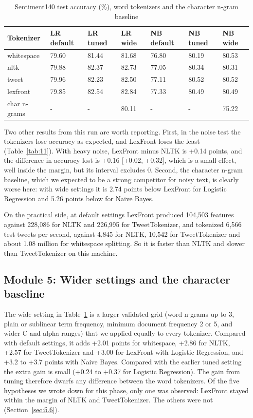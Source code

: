 \documentclass[journal,onecolumn,12pt,a4paper]{IEEEtran}
\begin{document}
\begin{table}[!tb]
\caption{Sentiment140 test accuracy (\%), word tokenizers and the character n-gram baseline}\label{tab:10}
\centering
\footnotesize
\setlength{\tabcolsep}{4pt}
\begin{tabular}{lllllll}
\toprule
\textbf{Tokenizer} & \textbf{LR default} & \textbf{LR tuned} & \textbf{LR wide} & \textbf{NB default} & \textbf{NB tuned} & \textbf{NB wide} \\
\midrule
whitespace & 79.60 & 81.44 & 81.68 & 76.80 & 80.19 & 80.53 \\
nltk & 79.88 & 82.37 & 82.73 & 77.05 & 80.34 & 80.31 \\
tweet & 79.96 & 82.23 & 82.50 & 77.11 & 80.52 & 80.52 \\
lexfront & 79.85 & 82.54 & 82.84 & 77.33 & 80.49 & 80.49 \\
char n-grams & - & - & 80.11 & - & - & 75.22 \\
\bottomrule
\end{tabular}
\end{table}

Two other results from this run are worth reporting. First, in the noise test the tokenizers lose accuracy as expected, and LexFront loses the least (Table~\ref{tab:11}). With heavy noise, LexFront minus NLTK is +0.14 points, and the difference in accuracy lost is +0.16 [+0.02, +0.32], which is a small effect, well inside the margin, but its interval excludes 0. Second, the character n-gram baseline, which we expected to be a strong competitor for noisy text, is clearly worse here: with wide settings it is 2.74 points below LexFront for Logistic Regression and 5.26 points below for Naive Bayes.

On the practical side, at default settings LexFront produced 104,503 features against 228,086 for NLTK and 226,995 for TweetTokenizer, and tokenized 6,566 test tweets per second, against 4,845 for NLTK, 10,542 for TweetTokenizer and about 1.08 million for whitespace splitting. So it is faster than NLTK and slower than TweetTokenizer on this machine.

\subsection{Module 5: Wider settings and the character baseline}\label{sec:4.8}
The wide setting in Table~\ref{tab:10} is a larger validated grid (word n-grams up to 3, plain or sublinear term frequency, minimum document frequency 2 or 5, and wider C and alpha ranges) that we applied equally to every tokenizer. Compared with default settings, it adds +2.01 points for whitespace, +2.86 for NLTK, +2.57 for TweetTokenizer and +3.00 for LexFront with Logistic Regression, and +3.2 to +3.7 points with Naive Bayes. Compared with the earlier tuned setting the extra gain is small (+0.24 to +0.37 for Logistic Regression). The gain from tuning therefore dwarfs any difference between the word tokenizers. Of the five hypotheses we wrote down for this phase, only one was observed: LexFront stayed within the margin of NLTK and TweetTokenizer. The others were not (Section~\ref{sec:5.6}).
\end{document}
